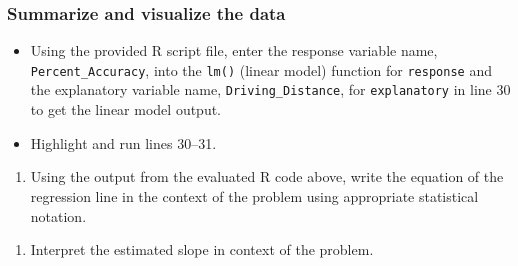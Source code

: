 \documentclass[
]{report}
\newenvironment{Shaded}{\begin{snugshade}}{\end{snugshade}}
\newcommand{\AttributeTok}[1]{\textcolor[rgb]{0.13,0.29,0.53}{#1}}
\newcommand{\CommentTok}[1]{\textcolor[rgb]{0.56,0.35,0.01}{\textit{#1}}}
\newcommand{\DecValTok}[1]{\textcolor[rgb]{0.00,0.00,0.81}{#1}}
\newcommand{\FunctionTok}[1]{\textcolor[rgb]{0.13,0.29,0.53}{\textbf{#1}}}
\newcommand{\NormalTok}[1]{#1}
\newcommand{\OtherTok}[1]{\textcolor[rgb]{0.56,0.35,0.01}{#1}}
\newcommand{\SpecialCharTok}[1]{\textcolor[rgb]{0.81,0.36,0.00}{\textbf{#1}}}
\providecommand{\tightlist}{%
  \setlength{\itemsep}{0pt}\setlength{\parskip}{0pt}}
\begin{document}
\newpage

\hypertarget{summarize-and-visualize-the-data-6}{%
\subsubsection*{Summarize and visualize the data}\label{summarize-and-visualize-the-data-6}}

\begin{itemize}
\item
  Using the provided R script file, enter the response variable name, \texttt{Percent\_Accuracy}, into the \texttt{lm()} (linear model) function for \texttt{response} and the explanatory variable name, \texttt{Driving\_Distance}, for \texttt{explanatory} in line 30 to get the linear model output.
\item
  Highlight and run lines 30--31.
\end{itemize}

\begin{Shaded}
\end{Shaded}

\begin{enumerate}
\def\labelenumi{\arabic{enumi}.}
\setcounter{enumi}{4}
\tightlist
\item
  Using the output from the evaluated R code above, write the equation of the regression line in the context of the problem using appropriate statistical notation.
\end{enumerate}

\vspace{1in}

\begin{enumerate}
\def\labelenumi{\arabic{enumi}.}
\setcounter{enumi}{5}
\tightlist
\item
  Interpret the estimated slope in context of the problem.
\end{enumerate}

\vspace{1in}
\end{document}
